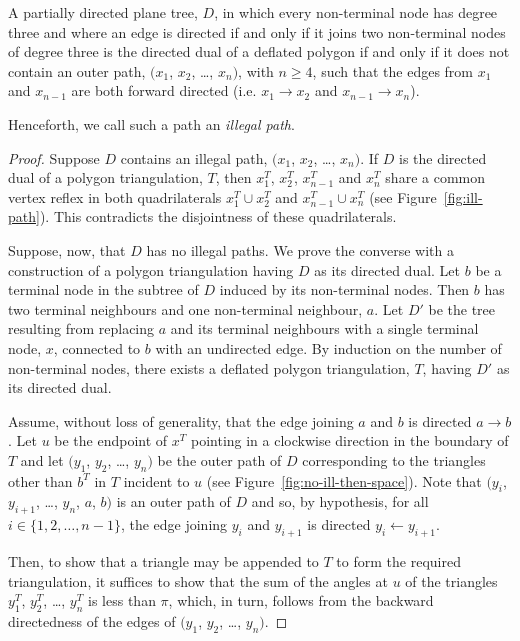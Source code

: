\documentclass{amsart}
\begin{document}
\begin{theorem}
  \label{thm:ddd-iff-nip}
  A partially directed plane tree, $D$, in which every non-terminal
  node has degree three and where an edge is directed if and only if
  it joins two non-terminal nodes of degree three is the directed dual
  of a deflated polygon if and only if it does not contain an outer
  path, $(x_1$, $x_2$, \ldots, $x_n)$, with $n\ge 4$, such that the
  edges from $x_1$ and $x_{n-1}$ are both forward directed (i.e.
  $x_1\rightarrow x_2$ and $x_{n-1}\rightarrow x_n$).
\end{theorem}
Henceforth, we call such a path an \emph{illegal path}.
\begin{proof}
  Suppose $D$ contains an illegal path, $(x_1$, $x_2$, \ldots, $x_n)$.
  If $D$ is the directed dual of a polygon triangulation, $T$, then
  $x_1^T$, $x_2^T$, $x_{n-1}^T$ and $x_n^T$ share a common vertex
  reflex in both quadrilaterals $x_1^T\cup x_2^T$ and $x_{n-1}^T\cup
  x_n^T$ (see Figure~\ref{fig:ill-path}).  This contradicts the
  disjointness of these quadrilaterals.
  
  Suppose, now, that $D$ has no illegal paths.  We prove the converse
  with a construction of a polygon triangulation having $D$ as its
  directed dual.  Let $b$ be a terminal node in the subtree of $D$
  induced by its non-terminal nodes.  Then $b$ has two terminal
  neighbours and one non-terminal neighbour, $a$.  Let $D'$ be the
  tree resulting from replacing $a$ and its terminal neighbours with a
  single terminal node, $x$, connected to $b$ with an undirected edge.
  By induction on the number of non-terminal nodes, there exists a
  deflated polygon triangulation, $T$, having $D'$ as its directed
  dual.
  
  Assume, without loss of generality, that the edge joining $a$ and
  $b$ is directed $a\rightarrow b$.  Let $u$ be the endpoint of
  $x^{T}$ pointing in a clockwise direction in the boundary of $T$ and
  let $(y_1$, $y_2$, \ldots, $y_n)$ be the outer path of $D$
  corresponding to the triangles other than $b^{T}$ in $T$ incident to
  $u$ (see Figure~\ref{fig:no-ill-then-space}).  Note that $(y_i$,
  $y_{i+1}$, \ldots, $y_n$, $a$, $b)$ is an outer path of $D$ and so,
  by hypothesis, for all $i\in\{1, 2, \ldots, n-1\}$, the edge joining
  $y_i$ and $y_{i+1}$ is directed $y_i\leftarrow y_{i+1}$.
  
  Then, to show that a triangle may be appended to $T$ to form the
  required triangulation, it suffices to show that the sum of the
  angles at $u$ of the triangles $y_1^{T}$, $y_2^{T}$, \ldots,
  $y_n^{T}$ is less than $\pi$, which, in turn, follows from the
  backward directedness of the edges of $(y_1$, $y_2$, \ldots, $y_n)$.
\end{proof}
\end{document}
